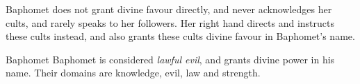 Baphomet does not grant divine favour directly, and never acknowledges her 
cults, and rarely speaks to her followers. Her right hand 
 directs and instructs these cults instead, and also 
grants these cults divine favour in Baphomet's name.

\begin{35e}{Baphomet}
  Baphomet is considered \emph{lawful evil}, and  grants
  divine power in his name. Their domains are knowledge, evil, law and
  strength.
\end{35e}